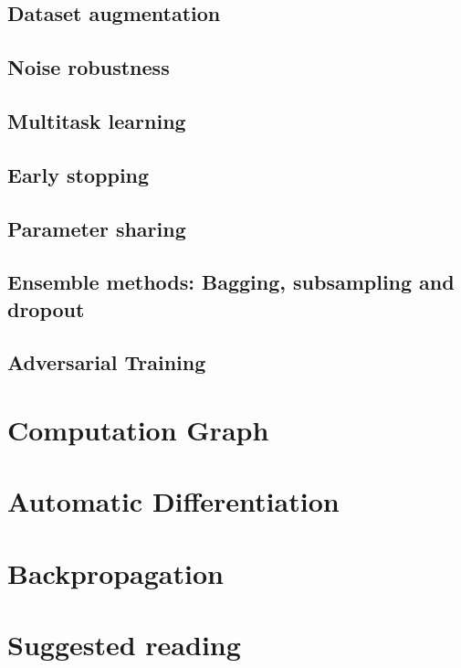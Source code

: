 \subsection{Dataset augmentation}
\subsection{Noise robustness}
\subsection{Multitask learning}
\subsection{Early stopping}
\subsection{Parameter sharing}
\subsection{Ensemble methods: Bagging, subsampling and dropout}
\subsection{Adversarial Training}

\section{Computation Graph}



\section{Automatic Differentiation}







\section{Backpropagation}

\section{Suggested reading}

